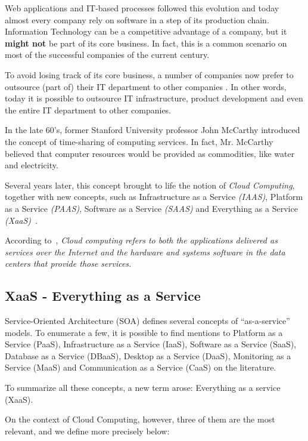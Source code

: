 \documentclass{article}
\begin{document}
Web applications and IT-based processes followed this evolution and today almost every company rely on software in a step of its production chain. Information Technology can be a competitive advantage of a company, but it \textbf{might not}  be part of its core business\cite{powell1997information}. In fact, this is a common scenario on most of the successful companies of the current century.

To avoid losing track of its core business, a number of companies now prefer to outsource (part of) their IT department to other companies \cite{quinn2013technology}. In other words, today it is possible to outsource IT infrastructure, product development and even the entire IT department to other companies.

In the late 60's, former Stanford University professor John McCarthy \cite{DBLP:journals/cacm/McCarthy67} introduced the concept of time-sharing of computing services. In fact, Mr. McCarthy believed that computer resources would be provided as commodities, like water and electricity. 

Several years later, this concept brought to life the notion of \textit{Cloud Computing}, together with new concepts, such as Infrastructure as a Service \textit{(IAAS)}, Platform as a Service \textit{(PAAS)}, Software as a Service \textit{(SAAS)} and Everything as a Service \textit{(XaaS)}~\cite{AViewOfCloudComputing}.

According to~\cite{AViewOfCloudComputing}, \textit{Cloud computing refers to both the applications delivered as services over the Internet and the hardware and systems software in the data centers that provide those services.} 


\subsection{XaaS - Everything as a Service}

Service-Oriented Architecture (SOA) defines several concepts of ``as-a-service'' models. To enumerate a few, it is possible to find mentions to Platform as a Service (PaaS), Infrastructure as a Service (IaaS), Software as a Service (SaaS), Database as a Service (DBaaS), Desktop as a Service (DaaS), Monitoring as a Service (MaaS) and Communication as a Service (CaaS) on the literature. 

To summarize all these concepts, a new term arose: Everything as a service (XaaS)\cite{7214098}.

On the context of Cloud Computing, however, three of them are the most relevant, and we define more precisely below:
\end{document}
